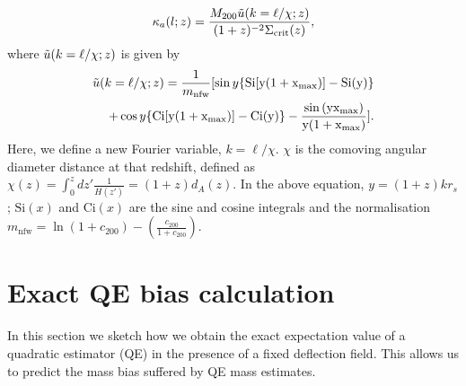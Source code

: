 \documentclass[prd, superscriptaddress, tightenlines, longbibliography, nofootinbib, eqsecnum, amsfonts, amsmath, floatfix, twocolumn, notitlepage]{revtex4-2}
\newcommand{\bs}[1]{\boldsymbol{#1}}
\begin{document}
\begin{equation}\label{eq:ft_anal1}
    \kappa_{a}(l;z) = \frac{M_{200}\Tilde{u}(k=\ell/\chi;z)}{(1+z)^{-2}\Sigma_{\text{crit}}(z)},
\end{equation}
where $\Tilde{u}(k=\ell/\chi;z)$ is given by
\begin{align}\label{eq:ft_anal2}
    \Tilde{u}(k=\ell/\chi;z) = \frac{1}{m_{\text{nfw}}}[\sin{y}\{\text{Si}[y(1+x_{\text{max}})] -\text{Si}(y)\} \nonumber \\ 
    +\cos{y}\{ \text{Ci}[y(1+x_{\text{max}})]-\text{Ci}(y) \} - \frac{\sin{(y x_{\text{max}})}}{y(1+x_{\text{max}})}].
\end{align}
Here, we define a new Fourier variable, $k =\ell/\chi$. $\chi$ is the comoving angular diameter distance at that redshift, defined as $\chi(z) = \int_0^z dz'\frac{1}{H(z')} = (1+z)d_A(z)$. In the above equation, $y = (1+z)kr_s$; $\text{Si}(x)$ and $\text{Ci}(x)$ are the sine and cosine integrals and the normalisation $m_{\text{nfw}} = \ln{(1+c_{200})}-\left(\frac{c_{200}}{1+c_{200}}\right)$.




\section{Exact QE bias calculation}\label{A1}
\newcommand{\hn}[0]{\hat n}
In this section we sketch how we obtain the exact expectation value of a quadratic estimator (QE) in the presence of a fixed deflection field. This allows us to predict the mass bias suffered by QE mass estimates.
\end{document}
